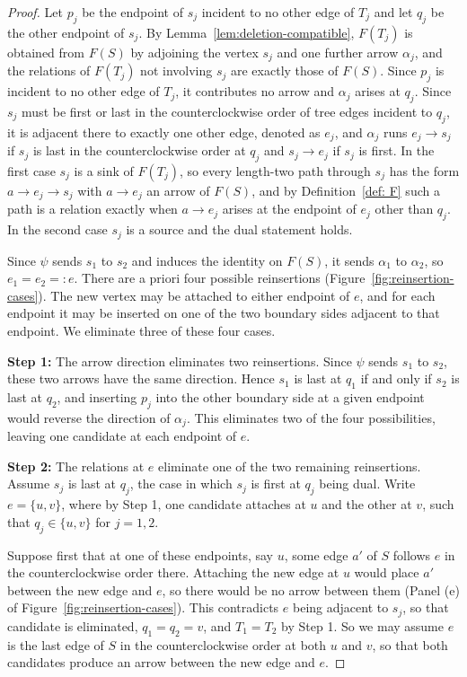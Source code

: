 \documentclass[12pt]{amsart}
\theoremstyle{definition}
\theoremstyle{remark}
\numberwithin{equation}{section}
\begin{document}
\begin{proof}
Let \(p_j\) be the endpoint of \(s_j\) incident to no other edge of \(T_j\) and let \(q_j\) be the other endpoint of \(s_j\). By Lemma~\ref{lem:deletion-compatible}, \(F(T_j)\) is obtained from \(F(S)\) by adjoining the vertex \(s_j\) and one further arrow \(\alpha_j\), and the relations of \(F(T_j)\) not involving \(s_j\) are exactly those of \(F(S)\). Since \(p_j\) is incident to no other edge of \(T_j\), it contributes no arrow and \(\alpha_j\) arises at \(q_j\). Since \(s_j\) must be first or last in the counterclockwise order of tree edges incident to \(q_j\), it is adjacent there to exactly one other edge, denoted as \(e_j\), and \(\alpha_j\) runs \(e_j\to s_j\) if \(s_j\) is last in the counterclockwise order at \(q_j\) and \(s_j\to e_j\) if \(s_j\) is first. In the first case \(s_j\) is a sink of \(F(T_j)\), so every length-two path through \(s_j\) has the form \(a\to e_j\to s_j\) with \(a\to e_j\) an arrow of \(F(S)\), and by Definition~\ref{def: F} such a path is a relation exactly when \(a\to e_j\) arises at the endpoint of \(e_j\) other than \(q_j\). In the second case \(s_j\) is a source and the dual statement holds.


Since \(\psi\) sends \(s_1\) to \(s_2\) and induces the identity on \(F(S)\), it sends \(\alpha_1\) to \(\alpha_2\), so \(e_1 = e_2 =: e\). There are a priori four possible reinsertions (Figure~\ref{fig:reinsertion-cases}). The new vertex may be attached to either endpoint of \(e\), and for each endpoint it may be inserted on one of the two boundary sides adjacent to that endpoint. We eliminate three of these four cases.

\textbf{Step 1:} The arrow direction eliminates two reinsertions.  Since \(\psi\) sends \(s_1\) to \(s_2\), these two arrows have the same direction. Hence \(s_1\) is last at \(q_1\) if and only if \(s_2\) is last at \(q_2\), and inserting \(p_j\) into the other boundary side at a given endpoint would reverse the direction of \(\alpha_j\). This eliminates two of the four possibilities, leaving one candidate at each endpoint of \(e\).

\textbf{Step 2:} The relations at \(e\) eliminate one of the two remaining reinsertions. Assume \(s_j\) is last at \(q_j\), the case in which \(s_j\) is first at \(q_j\) being dual. Write \(e = \{u,v\}\), where by Step 1, one candidate attaches  at \(u\) and the other at \(v\), such that \(q_j \in \{u,v\}\) for \(j = 1,2\).

Suppose first that at one of these endpoints, say \(u\), some edge \(a'\) of \(S\) follows \(e\) in the counterclockwise order there. Attaching the new edge at \(u\) would place \(a'\) between the new edge and \(e\), so there would be no arrow between them (Panel (e) of Figure~\ref{fig:reinsertion-cases}). This contradicts \(e\) being adjacent to \(s_j\), so that candidate is eliminated, \(q_1 = q_2 = v\), and \(T_1 = T_2\) by Step 1. So we may assume \(e\) is the last edge of \(S\) in the counterclockwise order at both \(u\) and \(v\), so that both candidates produce an arrow between the new edge and \(e\).


\end{proof}
\end{document}
